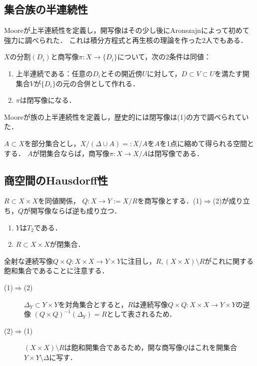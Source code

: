 \documentclass[uplatex,dvipdfmx]{jsreport}
\begin{document}
\subsection{集合族の半連続性}

\begin{tcolorbox}[colframe=ForestGreen, colback=ForestGreen!10!white,breakable,colbacktitle=ForestGreen!40!white,coltitle=black,fonttitle=\bfseries\sffamily,
title=]
    Mooreが上半連続性を定義し，開写像はその少し後にAronszajnによって初めて強力に調べられた．
    これは積分方程式と再生核の理論を作った2人でもある．
\end{tcolorbox}

\begin{proposition}[商写像が閉になる必要十分条件]
    $X$の分割$(D_i)$と商写像$\pi:X\to\{D_i\}$について，次の2条件は同値：
    \begin{enumerate}
        \item 上半連続である：任意の$D_i$とその開近傍$U$に対して，$D\subset V\subset U$を満たす開集合$V$が$\{D_i\}$の元の合併として作れる．
        \item $\pi$は閉写像になる．
    \end{enumerate}
    Mooreが族の上半連続性を定義し，歴史的には閉写像は(1)の方で調べられていた．
\end{proposition}

\begin{corollary}
    $A\subset X$を部分集合とし，$X/(\Delta\cup A)=:X/A$を$A$を1点に縮めて得られる空間とする．
    $A$が閉集合ならば，商写像$\pi:X\to X/A$は閉写像である．
\end{corollary}

\subsection{商空間のHausdorff性}

\begin{proposition}
    $R\subset X\times X$を同値関係，
    $Q:X\to Y:=X/R$を商写像とする．(1)$\Rightarrow$(2)が成り立ち，$Q$が開写像ならば逆も成り立つ．
    \begin{enumerate}
        \item $Y$は$T_2$である．
        \item $R\subset X\times X$が閉集合．
    \end{enumerate}
\end{proposition}
\begin{Proof}
    全射な連続写像$Q\times Q:X\times X\to Y\times Y$に注目し，$R,(X\times X)\setminus R$がこれに関する飽和集合であることに注意する．
    \begin{description}
        \item[(1)$\Rightarrow$(2)] $\Delta_Y\subset Y\times Y$を対角集合とすると，$R$は連続写像$Q\times Q:X\times X\to Y\times Y$の逆像
        $(Q\times Q)^{-1}(\Delta_Y)=R$として表されるため．
        \item[(2)$\Rightarrow$(1)] $(X\times X)\setminus R$は飽和開集合であるため，開な商写像$Q$はこれを開集合$Y\times Y\setminus\Delta$に写す．
    \end{description}
\end{Proof}
\end{document}
